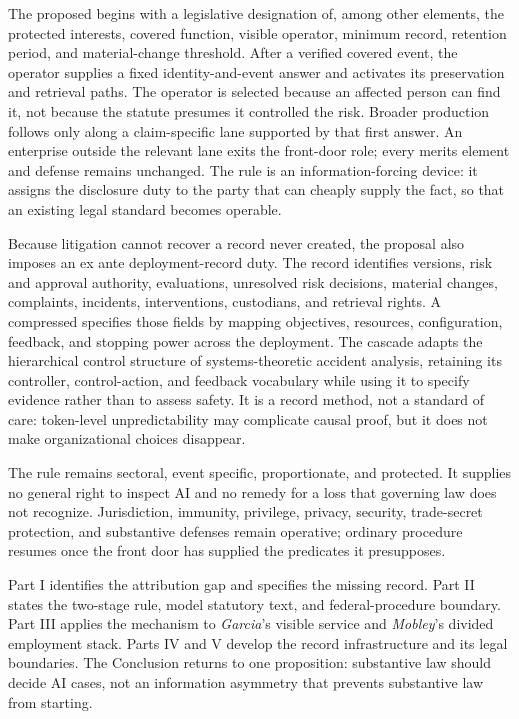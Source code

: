 The proposed  begins with a legislative designation of, among other elements, the protected interests, covered function, visible operator, minimum record, retention period, and material-change threshold. After a verified covered event, the operator supplies a fixed identity-and-event answer and activates its preservation and retrieval paths. The operator is selected because an affected person can find it, not because the statute presumes it controlled the risk. Broader production follows only along a claim-specific lane supported by that first answer. An enterprise outside the relevant lane exits the front-door role; every merits element and defense remains unchanged. The rule is an information-forcing device: it assigns the disclosure duty to the party that can cheaply supply the fact, so that an existing legal standard becomes operable.

Because litigation cannot recover a record never created, the proposal also imposes an ex ante deployment-record duty. The record identifies versions, risk and approval authority, evaluations, unresolved risk decisions, material changes, complaints, incidents, interventions, custodians, and retrieval rights. A compressed  specifies those fields by mapping objectives, resources, configuration, feedback, and stopping power across the deployment. The cascade adapts the hierarchical control structure of systems-theoretic accident analysis, retaining its controller, control-action, and feedback vocabulary while using it to specify evidence rather than to assess safety. It is a record method, not a standard of care: token-level unpredictability may complicate causal proof, but it does not make organizational choices disappear.

The rule remains sectoral, event specific, proportionate, and protected. It supplies no general right to inspect AI and no remedy for a loss that governing law does not recognize. Jurisdiction, immunity, privilege, privacy, security, trade-secret protection, and substantive defenses remain operative; ordinary procedure resumes once the front door has supplied the predicates it presupposes.

Part I identifies the attribution gap and specifies the missing record. Part II states the two-stage rule, model statutory text, and federal-procedure boundary. Part III applies the mechanism to \emph{Garcia}'s visible service and \emph{Mobley}'s divided employment stack. Parts IV and V develop the record infrastructure and its legal boundaries. The Conclusion returns to one proposition: substantive law should decide AI cases, not an information asymmetry that prevents substantive law from starting.

\clearpage
